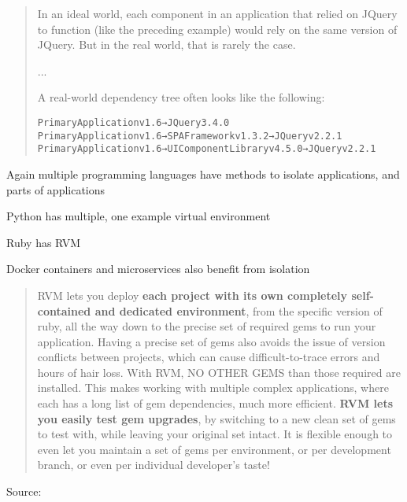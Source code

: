 \documentclass[Screen16to9,17pt]{foils}
\begin{document}


\begin{quote}
In an ideal world, each component in an application that relied on JQuery to function
(like the preceding example) would rely on the same version of JQuery. But in the
real world, that is rarely the case.

...

A real-world dependency tree often looks like the following:
\begin{alltt}\footnotesize
Primary Application v1.6 → JQuery 3.4.0
Primary Application v1.6 → SPA Framework v1.3.2 → JQuery v2.2.1
Primary Application v1.6 → UI Component Library v4.5.0 → JQuery v2.2.1
\end{alltt}
\end{quote}

\begin{list2}
\item Again multiple programming languages have methods to isolate applications, and parts of applications
\item Python has multiple, one example virtual environment 
\item Ruby has RVM 
\item Docker containers and microservices also benefit from isolation
\end{list2}





\begin{quote}
RVM lets you deploy {\bf each project with its own completely self-contained and dedicated environment}, from the specific version of ruby, all the way down to the precise set of required gems to run your application. Having a precise set of gems also avoids the issue of version conflicts between projects, which can cause difficult-to-trace errors and hours of hair loss. With RVM, NO OTHER GEMS than those required are installed. This makes working with multiple complex applications, where each has a long list of gem dependencies, much more efficient. {\bf RVM lets you easily test gem upgrades}, by switching to a new clean set of gems to test with, while leaving your original set intact. It is flexible enough to even let you maintain a set of gems per environment, or per development branch, or even per individual developer's taste!
\end{quote}
Source: 
\end{document}
